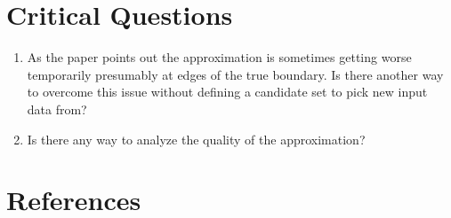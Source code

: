 \documentclass[oneside, notitlepage, twocolumn]{scrartcl}
\begin{document}
\section{Critical Questions}
\begin{enumerate}
    \item As the paper points out the approximation is sometimes getting worse temporarily presumably at edges of the true boundary.
        Is there another way to overcome this issue without defining a candidate set to pick new input data from?
    \item Is there any way to analyze the quality of the approximation?
\end{enumerate}

\section{References}
\begingroup
\renewcommand{\section}[2]{}%
\nocite{*}
\printbibliography%
\endgroup
\end{document}
